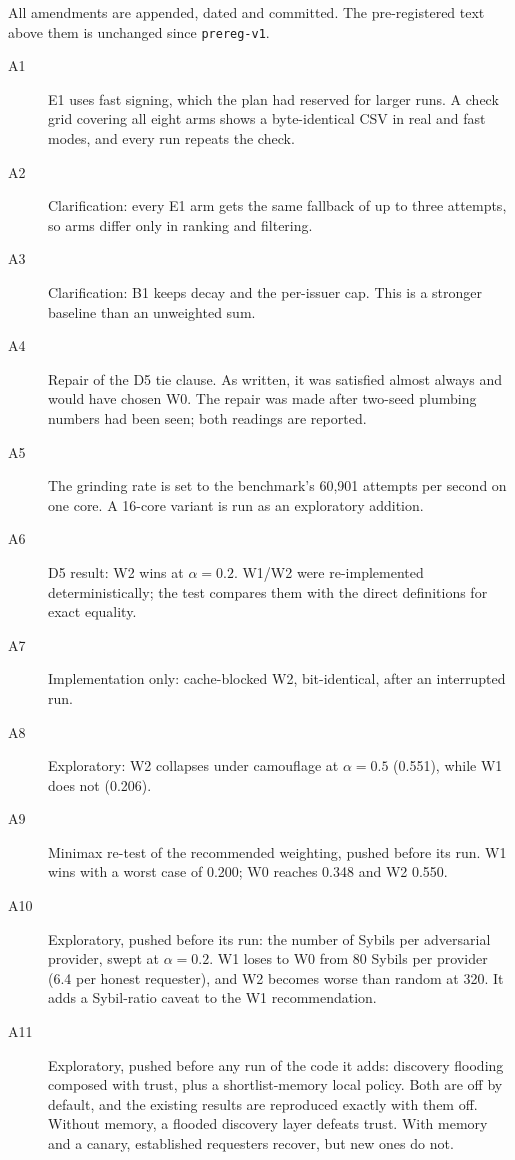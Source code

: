 All amendments are appended, dated and committed. The pre-registered text
above them is unchanged since \texttt{prereg-v1}.
\begin{description}
\item[A1] E1 uses fast signing, which the plan had reserved for larger
  runs. A check grid covering all eight arms shows a byte-identical CSV
  in real and fast modes, and every run repeats the check.
\item[A2] Clarification: every E1 arm gets the same fallback of up to
  three attempts, so arms differ only in ranking and filtering.
\item[A3] Clarification: B1 keeps decay and the per-issuer cap. This is
  a stronger baseline than an unweighted sum.
\item[A4] Repair of the D5 tie clause. As written, it was satisfied almost
  always and would have chosen W0. The repair was made after two-seed
  plumbing numbers had been seen; both readings are reported.
\item[A5] The grinding rate is set to the benchmark's 60,901 attempts per
  second on one core. A 16-core variant is run as an exploratory
  addition.
\item[A6] D5 result: W2 wins at $\alpha{=}0.2$. W1/W2 were re-implemented
  deterministically; the test compares them with the direct definitions
  for exact equality.
\item[A7] Implementation only: cache-blocked W2, bit-identical, after an
  interrupted run.
\item[A8] Exploratory: W2 collapses under camouflage at $\alpha{=}0.5$
  (0.551), while W1 does not (0.206).
\item[A9] Minimax re-test of the recommended weighting, pushed before its
  run. W1 wins with a worst case of 0.200; W0 reaches 0.348 and W2 0.550.
\item[A10] Exploratory, pushed before its run: the number of Sybils per
  adversarial provider, swept at $\alpha{=}0.2$. W1 loses to W0 from 80
  Sybils per provider (6.4 per honest requester), and W2 becomes worse
  than random at 320. It adds a Sybil-ratio caveat to the W1
  recommendation.
\item[A11] Exploratory, pushed before any run of the code it adds:
  discovery flooding composed with trust, plus a shortlist-memory local
  policy. Both are off by default, and the existing results are
  reproduced exactly with them off. Without memory, a flooded discovery
  layer defeats trust. With memory and a canary, established requesters
  recover, but new ones do not.

\end{description}
